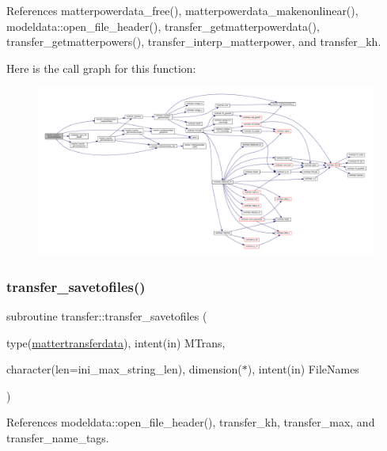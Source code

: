 References matterpowerdata\+\_\+free(), matterpowerdata\+\_\+makenonlinear(), modeldata\+::open\+\_\+file\+\_\+header(), transfer\+\_\+getmatterpowerdata(), transfer\+\_\+getmatterpowers(), transfer\+\_\+interp\+\_\+matterpower, and transfer\+\_\+kh.

Here is the call graph for this function\+:
\nopagebreak
\begin{figure}[H]
\begin{center}
\leavevmode
\includegraphics[width=350pt]{namespacetransfer_a4204b279b39e55f31b7948dec07fd7ed_cgraph}
\end{center}
\end{figure}
\mbox{\label{namespacetransfer_adc67bad9d6015b3ecd203551b927d522}} 
\subsubsection{\texorpdfstring{transfer\+\_\+savetofiles()}{transfer\_savetofiles()}}
{\footnotesize\ttfamily subroutine transfer\+::transfer\+\_\+savetofiles (\begin{DoxyParamCaption}\item[{type(\mbox{\hyperlink{structtransfer_1_1mattertransferdata}{mattertransferdata}}), intent(in)}]{M\+Trans,  }\item[{character(len=ini\+\_\+max\+\_\+string\+\_\+len), dimension($\ast$), intent(in)}]{File\+Names }\end{DoxyParamCaption})}



References modeldata\+::open\+\_\+file\+\_\+header(), transfer\+\_\+kh, transfer\+\_\+max, and transfer\+\_\+name\+\_\+tags.

